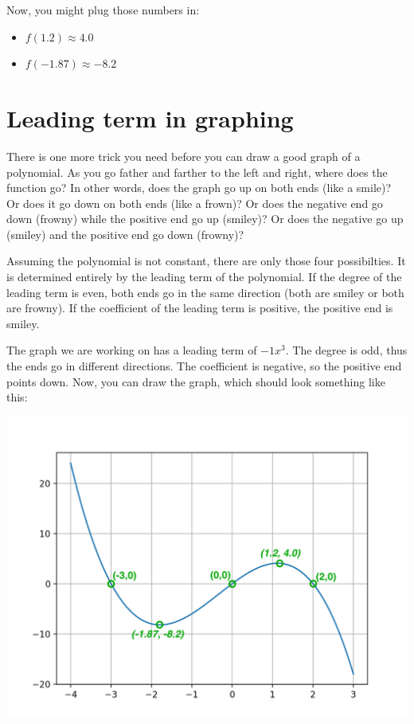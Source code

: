 Now, you might plug those numbers in:
\begin{itemize}
\item $f(1.2) \approx 4.0 $
\item $f(-1.87) \approx -8.2$
\end{itemize}

\section{Leading term in graphing}

There is one more trick you need before you can draw a good graph of a
polynomial. As you go father and farther to the left and right, where
does the function go? In other words, does the graph go up on both ends
(like a smile)? Or does it go down on both ends (like a frown)? Or
does the negative end go down (frowny) while the positive end go up
(smiley)? Or does the negative go up (smiley) and the positive end go
down (frowny)?

Assuming the polynomial is not constant, there are only those four
possibilties. It is determined entirely by the leading term of the
polynomial.  If the degree of the leading term is even, both ends go
in the same direction (both are smiley or both are frowny).  If the
coefficient of the leading term is positive, the positive end is
smiley.

The graph we are working on has a leading term of $-1x^3$. The degree is odd, thus the ends go in different directions. The coefficient is negative, so the positive end points down.  Now, you can draw the graph, which should look something like this:

\includegraphics[width=\textwidth]{annotated_graph.png}
